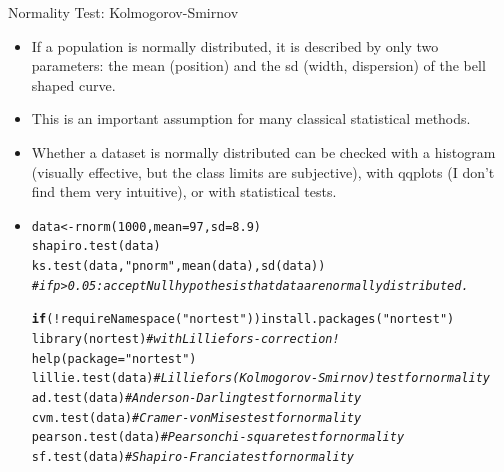\documentclass[xcolor=table,           xcolor=dvipsnames]{beamer}\usepackage[]{graphicx}\usepackage[]{color}
\makeatletter
\newcommand{\hlnum}[1]{\textcolor[rgb]{0,0,0}{#1}}
\newcommand{\hlstr}[1]{\textcolor[rgb]{0.545,0.137,0.137}{#1}}
\newcommand{\hlcom}[1]{\textcolor[rgb]{0,0.392,0}{\textit{#1}}}
\newcommand{\hlopt}[1]{\textcolor[rgb]{0,0,0}{#1}}
\newcommand{\hlstd}[1]{\textcolor[rgb]{0,0,0}{#1}}
\newcommand{\hlkwa}[1]{\textcolor[rgb]{1,0,0}{\textbf{#1}}}
\newcommand{\hlkwb}[1]{\textcolor[rgb]{0,0,0}{#1}}
\newcommand{\hlkwc}[1]{\textcolor[rgb]{1,0,1}{#1}}
\newcommand{\hlkwd}[1]{\textcolor[rgb]{0,0,1}{#1}}
\newenvironment{kframe}{%
 \def\at@end@of@kframe{}%
 \ifinner\ifhmode%
  \def\at@end@of@kframe{\end{minipage}}%
  \begin{minipage}{\columnwidth}%
 \fi\fi%
 \def\FrameCommand##1{\hskip\@totalleftmargin \hskip-\fboxsep
 \colorbox{shadecolor}{##1}\hskip-\fboxsep
     \hskip-\linewidth \hskip-\@totalleftmargin \hskip\columnwidth}%
 \MakeFramed {\advance\hsize-\width
   \@totalleftmargin\z@ \linewidth\hsize
   \@setminipage}}%
 {\par\unskip\endMakeFramed%
 \at@end@of@kframe}
\newenvironment{knitrout}{}{} %
\makeatother
\begin{document}
\begin{frame}[fragile]{Normality Test: Kolmogorov-Smirnov}
\pause
\begin{itemize}[<+->]
  \item If a population is normally distributed, it is described by only two parameters: the mean (position) and the sd (width, dispersion) of the bell shaped curve.
  \item This is an important assumption for many classical statistical methods.
  \item Whether a dataset is normally distributed can be checked with a histogram (visually effective, but the class limits are subjective), with qqplots (I don't find them very intuitive), or with statistical tests.
\item  \tiny
\begin{knitrout}
\color{fgcolor}\begin{kframe}
\begin{alltt}
\hlstd{data} \hlkwb{<-} \hlkwd{rnorm}\hlstd{(}\hlnum{1000}\hlstd{,} \hlkwc{mean}\hlstd{=}\hlnum{97}\hlstd{,} \hlkwc{sd}\hlstd{=}\hlnum{8.9}\hlstd{)}
\hlkwd{shapiro.test}\hlstd{(data)}
\hlkwd{ks.test}\hlstd{(data,} \hlstr{"pnorm"}\hlstd{,} \hlkwd{mean}\hlstd{(data),} \hlkwd{sd}\hlstd{(data))}
\hlcom{# if p > 0.05: accept Nullhypothesis that data are normally distributed.}

\hlkwa{if}\hlstd{(}\hlopt{!}\hlkwd{requireNamespace}\hlstd{(}\hlstr{"nortest"}\hlstd{))} \hlkwd{install.packages}\hlstd{(}\hlstr{"nortest"}\hlstd{)}
\hlkwd{library}\hlstd{(nortest)}          \hlcom{# with Lilliefors-correction!}
\hlkwd{help}\hlstd{(}\hlkwc{package}\hlstd{=}\hlstr{"nortest"}\hlstd{)}
\hlkwd{lillie.test}\hlstd{(data)}  \hlcom{# Lilliefors (Kolmogorov-Smirnov) test for normality}
\hlkwd{ad.test}\hlstd{(data)}      \hlcom{# Anderson-Darling test for normality}
\hlkwd{cvm.test}\hlstd{(data)}     \hlcom{# Cramer-von Mises test for normality}
\hlkwd{pearson.test}\hlstd{(data)} \hlcom{# Pearson chi-square test for normality}
\hlkwd{sf.test}\hlstd{(data)}      \hlcom{# Shapiro-Francia test for normality}
\end{alltt}
\end{kframe}
\end{knitrout}
\end{itemize}
\label{nortest}
\end{frame}

\end{document}

